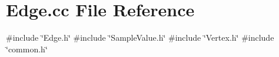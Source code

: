 \section{Edge.\+cc File Reference}
\label{Edge_8cc}
{\ttfamily \#include \char`\"{}Edge.\+h\char`\"{}}\newline
{\ttfamily \#include \char`\"{}Sample\+Value.\+h\char`\"{}}\newline
{\ttfamily \#include \char`\"{}Vertex.\+h\char`\"{}}\newline
{\ttfamily \#include \char`\"{}common.\+h\char`\"{}}\newline
